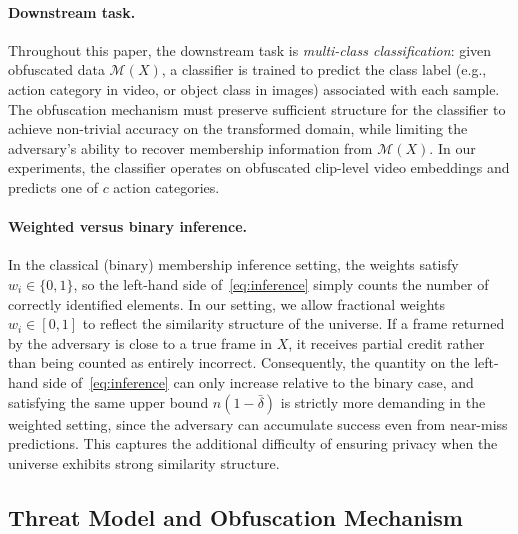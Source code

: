 \documentclass[letterpaper]{article} %
\begin{document}
\paragraph{Downstream task.}
Throughout this paper, the downstream task is \emph{multi-class classification}: given obfuscated data $\mathcal{M}(X)$, a classifier is trained to predict the class label (e.g., action category in video, or object class in images) associated with each sample. The obfuscation mechanism must preserve sufficient structure for the classifier to achieve non-trivial accuracy on the transformed domain, while limiting the adversary's ability to recover membership information from $\mathcal{M}(X)$. In our experiments, the classifier operates on obfuscated clip-level video embeddings and predicts one of $c$ action categories.

\paragraph{Weighted versus binary inference.}
In the classical (binary) membership inference setting, the weights satisfy $w_i \in \{0,1\}$, so the left-hand side of~\eqref{eq:inference} simply counts the number of correctly identified elements. In our setting, we allow fractional weights $w_i \in [0,1]$ to reflect the similarity structure of the universe. If a frame returned by the adversary is close to a true frame in $X$, it receives partial credit rather than being counted as entirely incorrect. Consequently, the quantity on the left-hand side of~\eqref{eq:inference} can only increase relative to the binary case, and satisfying the same upper bound $n(1-\bar{\delta})$ is strictly more demanding in the weighted setting, since the adversary can accumulate success even from near-miss predictions. This captures the additional difficulty of ensuring privacy when the universe exhibits strong similarity structure.

\subsection{Threat Model and Obfuscation Mechanism}
\end{document}
